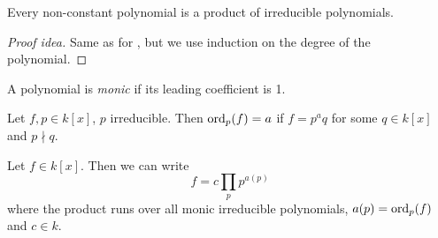 \begin{lemma}
    Every non-constant polynomial is a product of irreducible polynomials.
\end{lemma}
\begin{proof}[Proof idea]
    Same as for \Z, but we use induction on the degree of the polynomial.
\end{proof}

\begin{definition} \label{def:poly:monic}
    A polynomial is \emph{monic} if its leading coefficient is 1.
\end{definition}
\begin{definition}[Order] \label{def:poly:order}
    Let $f, p \in k[x]$, $p$ irreducible.
    Then $\operatorname{ord}_p(f) = a$ if $f = p^a q$ for some
    $q \in k[x]$ and $p \nmid q$.
\end{definition}

\begin{theorem*} \label{thm:poly:uft}
    Let $f \in k[x]$.
    Then we can write \[
        f = c \prod_p p^{a(p)}
    \] where the product runs over all monic irreducible polynomials,
    $a(p) = \operatorname{ord}_p(f)$ and $c \in k$.
\end{theorem*}
